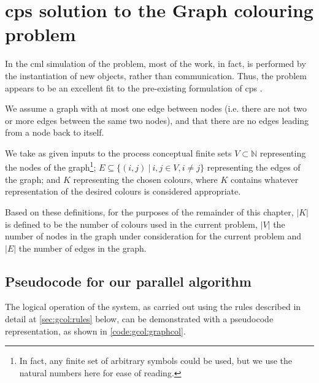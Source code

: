 \section{\label{sec:gcol:cpsys}\texorpdfstring{\gls{cps}}{cP systems} solution to the Graph colouring problem}
In the \gls{cml} simulation of the problem, most of the work, in fact, is performed by the instantiation of new objects, rather than communication.  Thus, the problem appears to be an excellent fit to the pre-existing formulation of \gls{cps} \cite{Nicolescu2018}.

We assume a graph with at most one edge between nodes (i.e. there are not two or more edges between the same two nodes), and that there are no edges leading from a node back to itself.

We take as given inputs to the process conceptual finite sets \(V \subset \mathbb{N}\) representing the nodes of the graph\footnote{In fact, any finite set of arbitrary symbols could be used, but we use the natural numbers here for ease of reading.}; \(E \subseteq \{(i,j)~|~i, j \in V, i \neq j \}\) representing the edges of the graph; and \(K\) representing the chosen colours, where \(K\) contains whatever representation of the desired colours is considered appropriate.

Based on these definitions, for the purposes of the remainder of this chapter, \(|K|\) is defined to be the number of colours used in the current problem, \(|V|\) the number of nodes in the graph under consideration for the current problem and \(|E|\) the number of edges in the graph.

\subsection{Pseudocode for our parallel algorithm}
The logical operation of the system, as carried out using the rules described in detail at \cref{sec:gcol:rules} below, can be demonstrated with a pseudocode representation, as shown in \cref{code:gcol:graphcol}.%

